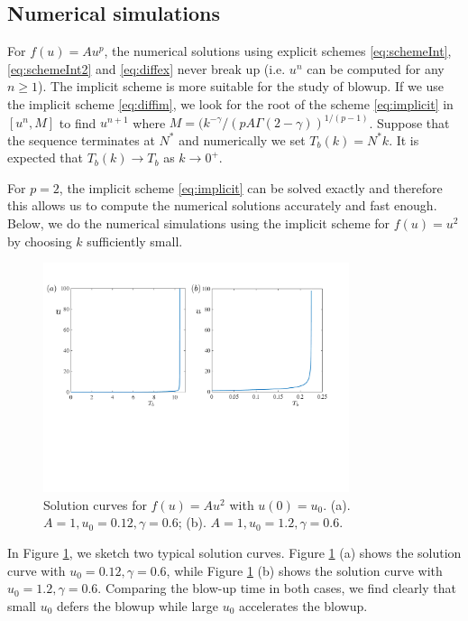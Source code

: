 \documentclass[12pt]{amsart}%
\theoremstyle{definition}
\theoremstyle{remark}
\renewcommand{\ge}{\geqslant}
\begin{document}
\subsection{Numerical simulations}

For $f(u)=Au^p$, the numerical solutions using explicit schemes \eqref{eq:schemeInt}, \eqref{eq:schemeInt2} and \eqref{eq:diffex} never break up (i.e. $u^n$ can be computed for any $n\ge 1$). The implicit scheme is more suitable for the study of blowup. If we use the implicit scheme \eqref{eq:diffim}, we look for the root of the scheme \eqref{eq:implicit} in $[u^n, M]$ to find $u^{n+1}$ where $M=(k^{-\gamma}/(pA\Gamma(2-\gamma))^{1/(p-1)}$. Suppose that the sequence terminates at $N^*$ and numerically we set $T_b(k)=N^* k$. It is expected that $T_b(k)\to T_b$ as $k\to 0^+$. 

For $p=2$, the implicit scheme \eqref{eq:implicit} can be solved exactly and therefore this allows us to compute the numerical solutions accurately and fast enough. Below, we do the numerical simulations using the implicit scheme for $f(u)=u^2$ by choosing $k$ sufficiently small. 


\begin{figure}
	\begin{center}
		\includegraphics[width=0.8\textwidth]{representative.pdf}
	\end{center}
	\caption{Solution curves for $f(u)=Au^2$ with $u(0)=u_0$. (a). $A=1, u_0=0.12 ,\gamma=0.6$; (b). $A=1, u_0=1.2, \gamma=0.6$. }
	\label{fig:rep}
\end{figure}


In Figure \ref{fig:rep}, we sketch two typical solution curves. Figure \ref{fig:rep} (a) shows the solution curve with $u_0=0.12, \gamma=0.6$, while Figure \ref{fig:rep} (b) shows the solution curve with $u_0=1.2, \gamma=0.6$. Comparing the blow-up time in both cases, we find clearly that small $u_0$ defers the blowup while large $u_0$ accelerates the blowup.
\end{document}
